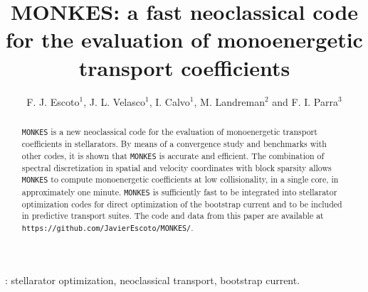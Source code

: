 \documentclass[10pt]{iopart}
\newcommand{\MONKES}{{\texttt{MONKES}}}
\begin{document}
\title[MONKES: a fast neoclassical code for the evaluation of monoenergetic transport coefficients]{MONKES: a fast neoclassical code for the evaluation of monoenergetic transport coefficients}

\author{F. J. Escoto$^1$, J. L. Velasco$^1$, I. Calvo$^1$, M. Landreman$^2$ and F. I. Parra$^3$}
\address{$^1$Laboratorio Nacional de Fusión, CIEMAT, 28040 Madrid, Spain}
\address{$^2$University of Maryland, College Park, MD 20742, USA}
\address{$^3$Princeton Plasma Physics Laboratory, Princeton, NJ 08540, USA}
\vspace{10pt}
\begin{indented}
\item[] %
\end{indented}

\begin{abstract}
	{\MONKES} is a new neoclassical code for the evaluation of monoenergetic transport coefficients in stellarators. By means of a convergence study and benchmarks with other codes, it is shown that {\MONKES} is accurate and efficient. The combination of spectral discretization in spatial and velocity coordinates with block sparsity allows {\MONKES} to compute monoenergetic coefficients at low collisionality, in a single core, in approximately one minute. {\MONKES} is sufficiently fast to be integrated into stellarator optimization codes for direct optimization of the bootstrap current and to be included in predictive transport suites. The code and data from this paper are available at \texttt{https://github.com/JavierEscoto/MONKES/}.   
\end{abstract}

%
\vspace{2pc}
: stellarator optimization, neoclassical transport,  bootstrap current.
%
\submitto{\NF}
%
% 
\ioptwocol
%
\end{document}
